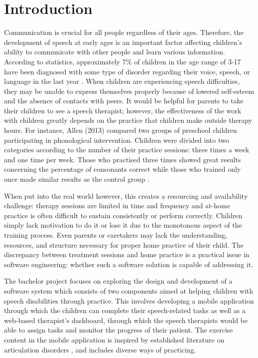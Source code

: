\chapter{Introduction}
\label{ch:introduction}

Communication is crucial for all people regardless of their ages. Therefore, the development of speech at early ages is an important factor affecting children's ability to communicate with other people and learn various information. According to statistics, approximately 7\% of children in the age range of 3-17 have been diagnosed with some type of disorder regarding their voice, speech, or language in the last year \cite{nidcd_statistics}. When children are experiencing speech difficulties, they may be unable to express themselves properly because of lowered self-esteem and the absence of contacts with peers. It would be helpful for parents to take their children to see a speech therapist; however, the effectiveness of the work with children greatly depends on the practice that children make outside therapy hours. For instance, Allen (2013) compared two groups of preschool children participating in phonological intervention. Children were divided into two categories according to the number of their practice sessions: three times a week and one time per week. Those who practised three times showed great results concerning the percentage of consonants correct while those who trained only once made similar results as the control group \cite{allen2013intervention}.

When put into the real world however, this creates a resourcing and availability challenge: therapy sessions are limited in time and frequency and at-home practice is often difficult to sustain consistently or perform correctly. Children simply lack motivation to do it or lose it due to the monotonous aspect of the training process. Even parents or caretakers may lack the understanding, resources, and structure necessary for proper home practice of their child. The discrepancy between treatment sessions and home practice is a practical issue in software engineering: whether such a software solution is capable of addressing it.

The bachelor project focuses on exploring the design and development of a software system which consists of two components aimed at helping children with speech disabilities through practice. This involves developing a mobile application through which the children can complete their speech-related tasks as well as a web-based therapist's dashboard, through which the speech therapists would be able to assign tasks and monitor the progress of their patient. The exercise content in the mobile application is inspired by established literature on articulation disorders \cite{todorova_articulation}, and includes diverse ways of practicing.

